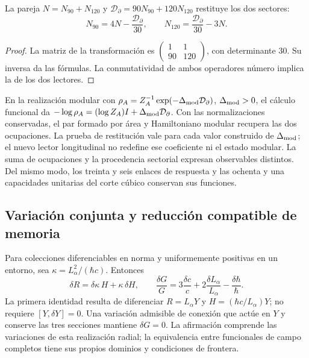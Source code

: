 \begin{proposition}
La pareja
$N=N_{90}+N_{120}$ y $\mathcal D_{\partial}=90N_{90}+120N_{120}$
restituye los dos sectores:
\[
 N_{90}=4N-\frac{\mathcal D_{\partial}}{30},\qquad
 N_{120}=\frac{\mathcal D_{\partial}}{30}-3N.
\]
\end{proposition}
\begin{proof}
La matriz de la transformación es
$\left(\begin{smallmatrix}1&1\\90&120\end{smallmatrix}\right)$,
con determinante $30$. Su inversa da las fórmulas. La conmutatividad
de ambos operadores número implica la de los dos lectores.
\end{proof}
En la realización modular con
$\rho_A=Z_A^{-1}\exp(-\Delta_{\rm mod}\mathcal D_{\partial})$,
$\Delta_{\rm mod}>0$, el cálculo funcional da
$-\log\rho_A=(\log Z_A)I+\Delta_{\rm mod}\mathcal D_{\partial}$.
Con las normalizaciones conservadas, el par formado por área y
Hamiltoniano modular recupera las dos ocupaciones. La prueba de restitución
vale para cada valor construido de $\Delta_{\rm mod}$; el nuevo lector
longitudinal no redefine ese coeficiente ni el estado modular.
La suma de ocupaciones y la procedencia sectorial expresan observables
distintos. Del mismo modo, los treinta y seis enlaces de respuesta y las
ochenta y una capacidades unitarias del corte cúbico conservan sus funciones.

\subsection{Variación conjunta y reducción compatible de memoria}
\label{md:rigidez:variaciones}

Para colecciones diferenciables en norma y uniformemente positivas en un
entorno, sea $\kappa=L_\alpha^2/(\hbar c)$. Entonces
\[
 \delta R=\delta\kappa\,H+\kappa\,\delta H,\qquad
 \frac{\delta G}{G}=3\frac{\delta c}{c}
 +2\frac{\delta L_\alpha}{L_\alpha}-\frac{\delta\hbar}{\hbar}.
\]
La primera identidad resulta de diferenciar
$R=L_\alpha Y$ y $H=(\hbar c/L_\alpha)Y$; no requiere
$[Y,\delta Y]=0$. Una variación admisible de conexión que actúe en $Y$
y conserve las tres secciones mantiene $\delta G=0$.
La afirmación comprende las variaciones de esta realización radial;
la equivalencia entre funcionales de campo completos tiene sus propios
dominios y condiciones de frontera.

